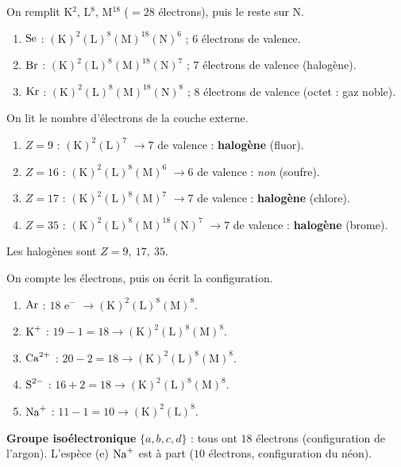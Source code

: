 \documentclass[11pt,a4paper]{article}
\begin{document}
\begin{corrige}
On remplit K$^2$, L$^8$, M$^{18}$ ($=28$ électrons), puis le reste sur N.
\begin{enumerate}[label=\alph*)]
  \item $\ce{Se}$ : $(\mathrm{K})^2(\mathrm{L})^8(\mathrm{M})^{18}(\mathrm{N})^6$ ; $6$ électrons de valence.
  \item $\ce{Br}$ : $(\mathrm{K})^2(\mathrm{L})^8(\mathrm{M})^{18}(\mathrm{N})^7$ ; $7$ électrons de
        valence (halogène).
  \item $\ce{Kr}$ : $(\mathrm{K})^2(\mathrm{L})^8(\mathrm{M})^{18}(\mathrm{N})^8$ ; $8$ électrons de
        valence (octet : gaz noble).
\end{enumerate}
\end{corrige}

\begin{corrige}
On lit le nombre d'électrons de la couche externe.
\begin{enumerate}[label=\alph*)]
  \item $Z=9$ : $(\mathrm{K})^2(\mathrm{L})^7$ $\to 7$ de valence : \textbf{halogène} (fluor).
  \item $Z=16$ : $(\mathrm{K})^2(\mathrm{L})^8(\mathrm{M})^6$ $\to 6$ de valence : \emph{non} (soufre).
  \item $Z=17$ : $(\mathrm{K})^2(\mathrm{L})^8(\mathrm{M})^7$ $\to 7$ de valence : \textbf{halogène} (chlore).
  \item $Z=35$ : $(\mathrm{K})^2(\mathrm{L})^8(\mathrm{M})^{18}(\mathrm{N})^7$ $\to 7$ de valence :
        \textbf{halogène} (brome).
\end{enumerate}
Les halogènes sont $Z = 9,\ 17,\ 35$.
\end{corrige}

\begin{corrige}[isoélectronie]
On compte les électrons, puis on écrit la configuration.
\begin{enumerate}[label=\alph*)]
  \item $\ce{Ar}$ : $18$ e$^-$ $\to (\mathrm{K})^2(\mathrm{L})^8(\mathrm{M})^8$.
  \item $\ce{K^{+}}$ : $19-1=18 \to (\mathrm{K})^2(\mathrm{L})^8(\mathrm{M})^8$.
  \item $\ce{Ca^{2+}}$ : $20-2=18 \to (\mathrm{K})^2(\mathrm{L})^8(\mathrm{M})^8$.
  \item $\ce{S^{2-}}$ : $16+2=18 \to (\mathrm{K})^2(\mathrm{L})^8(\mathrm{M})^8$.
  \item $\ce{Na^{+}}$ : $11-1=10 \to (\mathrm{K})^2(\mathrm{L})^8$.
\end{enumerate}
\textbf{Groupe isoélectronique} $\{a, b, c, d\}$ : tous ont $18$ électrons (configuration de l'argon).
L'espèce (e) $\ce{Na^{+}}$ est à part ($10$ électrons, configuration du néon).
\end{corrige}
\end{document}
